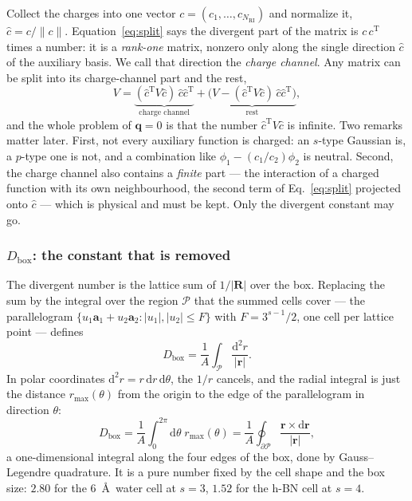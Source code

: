 \documentclass[%
 reprint,
superscriptaddress,
 amsmath,amssymb,
 aps,
prb,
]{revtex4-2}
\newcommand{\br}{\mathbf{r}}
\newcommand{\bR}{\mathbf{R}}
\newcommand{\bq}{\mathbf{q}}
\newcommand{\dd}{\mathrm{d}}
\newcommand{\Tr}{\mathrm{T}}
\begin{document}
Collect the charges into one vector $c = (c_1,\dots,c_{N_\mathrm{RI}})$ and normalize it,
$\hat c = c/\|c\|$. Equation~\eqref{eq:split} says the divergent part of the matrix is
$c\,c^\Tr$ times a number: it is a \emph{rank-one} matrix, nonzero only along the single
direction $\hat c$ of the auxiliary basis. We call that direction the \emph{charge channel}.
Any matrix can be split into its charge-channel part and the rest,
\begin{equation}
  V = \underbrace{(\hat c^\Tr V\hat c)\,\hat c\hat c^\Tr}_{\text{charge channel}}
  + \underbrace{\big(V - (\hat c^\Tr V\hat c)\,\hat c\hat c^\Tr\big)}_{\text{rest}},
\end{equation}
and the whole problem of $\bq=0$ is that the number $\hat c^\Tr V\hat c$ is infinite. Two
remarks matter later. First, not every auxiliary function is charged: an $s$-type
Gaussian is, a $p$-type one is not, and a combination like $\phi_1 - (c_1/c_2)\phi_2$ is
neutral. Second, the charge channel also contains a \emph{finite} part --- the interaction of a
charged function with its own neighbourhood, the second term of Eq.~\eqref{eq:split} projected
onto $\hat c$ --- which is physical and must be kept. Only the divergent constant may go.

\subsubsection{$D_\mathrm{box}$: the constant that is removed}

The divergent number is the lattice sum of $1/|\bR|$ over the box. Replacing the sum by the
integral over the region $\mathcal P$ that the summed cells cover --- the parallelogram
$\{u_1\mathbf a_1+u_2\mathbf a_2 : |u_1|,|u_2|\le F\}$ with $F = 3^{s-1}/2$, one cell per
lattice point --- defines
\begin{equation}
  D_\mathrm{box} = \frac{1}{A}\int_{\mathcal P}\frac{\dd^2 r}{|\br|} .
  \label{eq:Dbox}
\end{equation}
In polar coordinates $\dd^2r = r\,\dd r\,\dd\theta$, the $1/r$ cancels, and the radial
integral is just the distance $r_{\max}(\theta)$ from the origin to the edge of the
parallelogram in direction $\theta$:
\begin{equation}
  D_\mathrm{box} = \frac{1}{A}\int_0^{2\pi}\dd\theta\; r_{\max}(\theta)
  = \frac{1}{A}\oint_{\partial\mathcal P}\frac{\br\times\dd\br}{|\br|},
  \label{eq:Dbox_edge}
\end{equation}
a one-dimensional integral along the four edges of the box, done by Gauss--Legendre quadrature.
It is a pure number fixed by the cell shape and the box size: $2.80$ for the $6$~\AA\ water cell
at $s=3$, $1.52$ for the h-BN cell at $s=4$.
\end{document}
